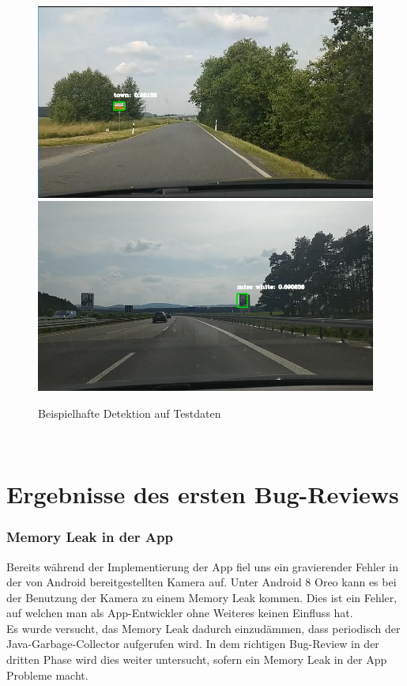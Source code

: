 \documentclass[12pt,a4paper,ngerman,enabledeprecatedfontcommands]{scrreprt}
\begin{document}
\begin{figure}[H]
\centering
\includegraphics[width=1\linewidth]{Grafiken/detector_1.PNG}
\includegraphics[width=1\linewidth]{Grafiken/detector_2.PNG}
\caption{Beispielhafte Detektion auf Testdaten}
\end{figure}

\\

\section{Ergebnisse des ersten Bug-Reviews}
\subsubsection*{Memory Leak in der \gls{App}}
Bereits während der Implementierung der \gls{App} fiel uns ein gravierender Fehler in der von Android bereitgestellten Kamera auf. Unter Android 8 \glqq{}Oreo\grqq{} kann es bei der Benutzung der Kamera zu einem Memory Leak kommen. Dies ist ein Fehler, auf welchen man als \gls{App}-Entwickler ohne Weiteres keinen Einfluss hat.\\
Es wurde versucht, das Memory Leak dadurch einzudämmen, dass periodisch der Java-Garbage-Collector aufgerufen wird. In dem \glqq{}richtigen\grqq{} Bug-Review in der dritten Phase wird dies weiter untersucht, sofern ein Memory Leak in der \gls{App} Probleme macht.\\
\end{document}
